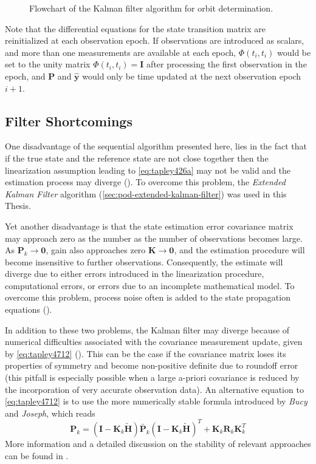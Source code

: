\begin{figure}
    \centering
    
    \caption{Flowchart of the Kalman filter algorithm for orbit determination.}
    \label{fig:kalman-pod}
\end{figure}

Note that the differential equations for the state transition matrix are 
reinitialized at each observation epoch. If observations are introduced as 
scalars, and more than one measurements are available at each epoch, $\Phi (t_i,t_i)$ 
would be set to the unity matrix $\Phi (t_i,t_i) = \bm{I}$ after processing the first 
observation in the epoch, and $\bm{P}$ and $\hat{\bm{y}}$ would only be time updated 
at the next observation epoch $i+1$.

\subsection{Filter Shortcomings}\label{ssec:pod-kalman-filter-shortcomings}
One disadvantage of the sequential algorithm presented here, lies in the fact
that if the true state and the reference state are not close together then the 
linearization assumption leading to \autoref{eq:tapley426a} may not be valid and 
the estimation process may diverge (\cite{Tapley2004}). To overcome this problem, 
the \emph{Extended Kalman Filter} algorithm (\autoref{sec:pod-extended-kalman-filter}) 
was used in this Thesis.

Yet another disadvantage is that the state estimation error covariance matrix may 
approach zero as the number as the number of observations becomes large. As 
$\bm{P}_k \to \bm{0}$, gain also approaches zero $\bm{K} \to \bm{0}$, and the 
estimation procedure will become insensitive to further observations. Consequently, 
the estimate will diverge due to either errors introduced in the linearization 
procedure, computational errors, or errors due to an incomplete mathematical model. 
To overcome this problem, process noise often is added to the state propagation 
equations (\cite{Tapley2004}).

In addition to these two problems, the Kalman filter may diverge because of
numerical difficulties associated with the covariance measurement update, given
by \autoref{eq:tapley4712} (\cite{Tapley2004}). This can be the case if the 
covariance matrix loses its properties of symmetry and become non-positive definite 
due to roundoff error (this pitfall is especially possible when a large a-priori
covariance is reduced by the incorporation of very accurate observation data). 
An alternative equation to \autoref{eq:tapley4712} is to use the more numerically 
stable formula introduced by \emph{Bucy} and \emph{Joseph}, which reads
\begin{equation}\label{eq:tapley4719}
    \bm{P}_k = \left( \bm{I} - \bm{K}_k \tilde{\bm{H}} \right) \bar{\bm{P}}_k
    \left( \bm{I} - \bm{K}_k \tilde{\bm{H}} \right)^{T} 
    + \bm{K}_k \bm{R}_k \bm{K}^{T}_k
\end{equation}
More information and a detailed discussion on the stability of relevant approaches 
can be found in \cite{Bierman1977}.
